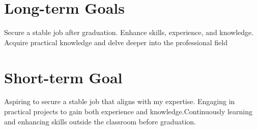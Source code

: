 \documentclass[letterpaper,11pt]{article}
\begin{document}
\section{Long-term Goals}
        {Secure a stable job after graduation. Enhance skills, experience, and knowledge. Acquire practical knowledge and delve deeper into the professional field}
        
\section{Short-term Goal}
        {Aspiring to secure a stable job that aligns with my expertise. Engaging in practical projects to gain both experience and knowledge.Continuously learning and enhancing skills outside the classroom before graduation.}


\end{document}
